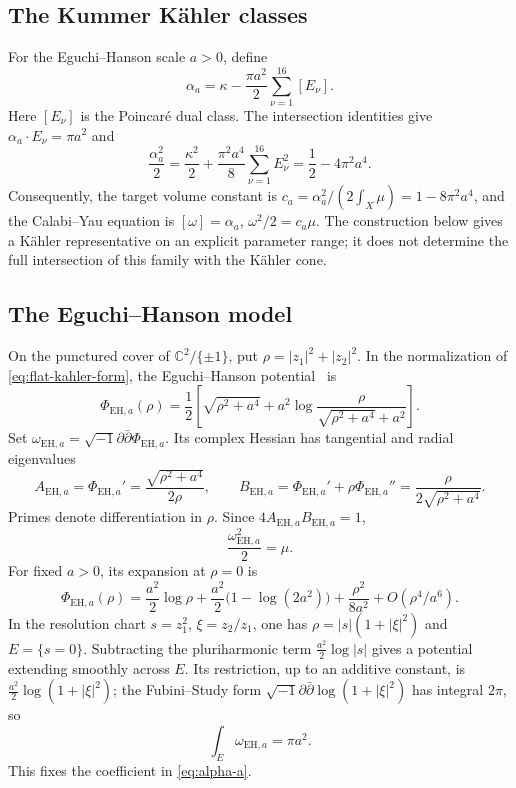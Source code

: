 \documentclass[11pt,a4paper,twoside]{article}
\numberwithin{equation}{section}
\theoremstyle{definition}
\theoremstyle{remark}
\newcommand{\ii}{\sqrt{-1}}
\begin{document}
\subsection{The Kummer K\"ahler classes}
\label{subsec:kummer-classes}
For the Eguchi--Hanson scale \(a>0\), define
\begin{equation}\label{eq:alpha-a}
\alpha_a=\kappa-\frac{\pi a^2}{2}
\sum_{\nu=1}^{16}[E_\nu].
\end{equation}
Here \([E_\nu]\) is the Poincar\'e dual class.
The intersection identities give \(\alpha_a\cdot E_\nu=\pi a^2\)
and
\begin{equation}\label{eq:alpha-volume}
\frac{\alpha_a^2}{2}
=\frac{\kappa^2}{2}
+\frac{\pi^2a^4}{8}\sum_{\nu=1}^{16}E_\nu^2
=\frac12-4\pi^2a^4.
\end{equation}
Consequently, the target volume constant is
\(c_a=\alpha_a^2/(2\int_X\mu)=1-8\pi^2a^4\), and the
Calabi--Yau equation is \([\omega]=\alpha_a\),
\(\omega^2/2=c_a\mu\). The construction below gives a
K\"ahler representative on an explicit parameter range; it does
not determine the full intersection of this family with the
K\"ahler cone.

\subsection{The Eguchi--Hanson model}
\label{subsec:EH-model}
On the punctured cover of \(\mathbb C^2/\{\pm1\}\), put
\(\rho=|z_1|^2+|z_2|^2\). In the normalization of
\eqref{eq:flat-kahler-form}, the Eguchi--Hanson potential~\cite{EguchiHanson} is
\begin{equation}\label{eq:EH-potential}
\Phi_{\mathrm{EH},a}(\rho)
=\frac12\left[\sqrt{\rho^2+a^4}
+a^2\log\frac{\rho}{\sqrt{\rho^2+a^4}+a^2}\right].
\end{equation}
Set \(\omega_{\mathrm{EH},a}=\ii\partial\bar\partial
\Phi_{\mathrm{EH},a}\). Its complex Hessian has tangential
and radial eigenvalues
\[
A_{\mathrm{EH},a}=\Phi_{\mathrm{EH},a}'
=\frac{\sqrt{\rho^2+a^4}}{2\rho},
\qquad B_{\mathrm{EH},a}=\Phi_{\mathrm{EH},a}'
+\rho\Phi_{\mathrm{EH},a}''
=\frac{\rho}{2\sqrt{\rho^2+a^4}}.
\]
Primes denote differentiation in \(\rho\). Since
\(4A_{\mathrm{EH},a}B_{\mathrm{EH},a}=1\),
\begin{equation}\label{eq:EH-volume}
\frac{\omega_{\mathrm{EH},a}^2}{2}=\mu.
\end{equation}
For fixed \(a>0\), its expansion at \(\rho=0\) is
\[
\Phi_{\mathrm{EH},a}(\rho)
=\frac{a^2}{2}\log\rho
+\frac{a^2}{2}\bigl(1-\log(2a^2)\bigr)
+\frac{\rho^2}{8a^2}+O(\rho^4/a^6).
\]
In the resolution chart \(s=z_1^2\), \(\xi=z_2/z_1\), one has
\(\rho=|s|(1+|\xi|^2)\) and \(E=\{s=0\}\).
Subtracting the pluriharmonic term \(\frac{a^2}{2}\log|s|\)
gives a potential extending smoothly across \(E\). Its restriction, up to an additive constant,
is \(\frac{a^2}{2}\log(1+|\xi|^2)\); the Fubini--Study
form \(\ii\partial\bar\partial\log(1+|\xi|^2)\) has integral
\(2\pi\), so
\begin{equation}\label{eq:EH-exceptional-area}
\int_E\omega_{\mathrm{EH},a}=\pi a^2.
\end{equation}
This fixes the coefficient in \eqref{eq:alpha-a}.
\end{document}
